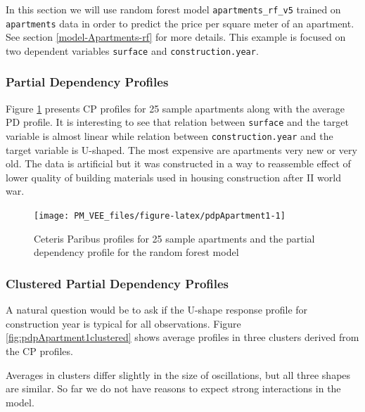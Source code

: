 \documentclass[12pt,]{krantz}
\begin{document}
In this section we will use random forest model \texttt{apartments\_rf\_v5} trained on \texttt{apartments} data in order to predict the price per square meter of an apartment. See section \ref{model-Apartments-rf} for more details.
This example is focused on two dependent variables \texttt{surface} and \texttt{construction.year}.

\hypertarget{partial-dependency-profiles-2}{%
\subsubsection{Partial Dependency Profiles}\label{partial-dependency-profiles-2}}

Figure \ref{fig:pdpApartment1} presents CP profiles for 25 sample apartments along with the average PD profile.
It is interesting to see that relation between \texttt{surface} and the target variable is almost linear while relation between \texttt{construction.year} and the target variable is U-shaped. The most expensive are apartments very new or very old. The data is artificial but it was constructed in a way to reassemble effect of lower quality of building materials used in housing construction after II world war.

\begin{figure}

{\centering \texttt{[image: PM\_VEE\_files/figure-latex/pdpApartment1-1]} 

}

\caption{Ceteris Paribus profiles for 25 sample apartments and the partial dependency profile for the random forest model}\label{fig:pdpApartment1}
\end{figure}

\hypertarget{clustered-partial-dependency-profiles-1}{%
\subsubsection{Clustered Partial Dependency Profiles}\label{clustered-partial-dependency-profiles-1}}

A natural question would be to ask if the U-shape response profile for construction year is typical for all observations. Figure \ref{fig:pdpApartment1clustered} shows average profiles in three clusters derived from the CP profiles.

Averages in clusters differ slightly in the size of oscillations, but all three shapes are similar. So far we do not have reasons to expect strong interactions in the model.
\end{document}
